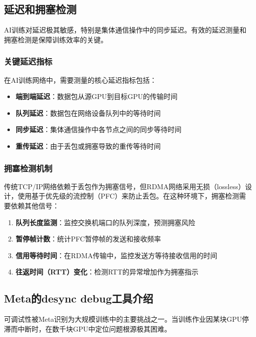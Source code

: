 \subsection{延迟和拥塞检测}

AI训练对延迟极其敏感，特别是集体通信操作中的同步延迟。有效的延迟测量和拥塞检测是保障训练效率的关键。

\subsubsection{关键延迟指标}

在AI训练网络中，需要测量的核心延迟指标包括：
\begin{itemize}
    \item \textbf{端到端延迟}：数据包从源GPU到目标GPU的传输时间
    \item \textbf{队列延迟}：数据包在网络设备队列中的等待时间
    \item \textbf{同步延迟}：集体通信操作中各节点之间的同步等待时间
    \item \textbf{重传延迟}：由于丢包或拥塞导致的重传等待时间
\end{itemize}

\subsubsection{拥塞检测机制}

传统TCP/IP网络依赖于丢包作为拥塞信号，但RDMA网络采用无损（lossless）设计，使用基于优先级的流控制（PFC）来防止丢包。在这种环境下，拥塞检测需要依赖其他信号：

\begin{enumerate}
    \item \textbf{队列长度监测}：监控交换机端口的队列深度，预测拥塞风险
    \item \textbf{暂停帧计数}：统计PFC暂停帧的发送和接收频率
    \item \textbf{信用等待时间}：在RDMA传输中，监控发送方等待接收信用的时间
    \item \textbf{往返时间（RTT）变化}：检测RTT的异常增加作为拥塞指示
\end{enumerate}

\subsection{Meta的desync debug工具介绍}

可调试性被Meta识别为大规模训练中的主要挑战之一。当训练作业因某块GPU停滞而中断时，在数千块GPU中定位问题根源极其困难。

